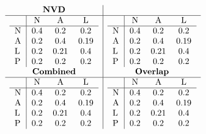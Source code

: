 \documentclass[11pt]{article}
\begin{document}
\begin{table}
	\centering
	\caption{Confusion Matrices for Attack Vector}
	\[
		\begin{array}{c|c}
			\textbf{NVD}                         \\
			\hline
			\begin{tabular}{l|ccc}
				  & N   & A    & L    \\
				\hline
				N & 0.4 & 0.2  & 0.2  \\
				A & 0.2 & 0.4  & 0.19 \\
				L & 0.2 & 0.21 & 0.4  \\
				P & 0.2 & 0.2  & 0.2  \\
			\end{tabular}
			                  &
			\begin{tabular}{l|ccc}
				  & N   & A    & L    \\
				\hline
				N & 0.4 & 0.2  & 0.2  \\
				A & 0.2 & 0.4  & 0.19 \\
				L & 0.2 & 0.21 & 0.4  \\
				P & 0.2 & 0.2  & 0.2  \\
			\end{tabular}
			\\
			\textbf{Combined} & \textbf{Overlap} \\
			\hline
			\begin{tabular}{l|ccc}
				  & N   & A    & L    \\
				\hline
				N & 0.4 & 0.2  & 0.2  \\
				A & 0.2 & 0.4  & 0.19 \\
				L & 0.2 & 0.21 & 0.4  \\
				P & 0.2 & 0.2  & 0.2  \\
			\end{tabular}
			                  &
			\begin{tabular}{l|ccc}
				  & N   & A    & L    \\
				\hline
				N & 0.4 & 0.2  & 0.2  \\
				A & 0.2 & 0.4  & 0.19 \\
				L & 0.2 & 0.21 & 0.4  \\
				P & 0.2 & 0.2  & 0.2  \\
			\end{tabular}
		\end{array}
	\]
\end{table}
\end{document}
